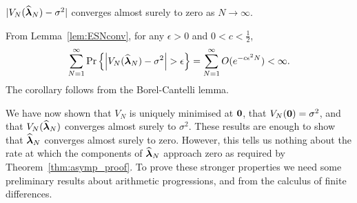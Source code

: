 \documentclass[journal]{IEEEtran}
\begin{document}
\begin{corollary}  \label{cor:ESNconvcor}
$\vert V_N(\widehat{\boldsymbol{\lambda}}_N) - \sigma^2 \vert$ converges almost surely to zero as $N\rightarrow\infty$.
\end{corollary}
\begin{IEEEproof}
From Lemma~\ref{lem:ESNconv}, for any $\epsilon > 0$ and $0 < c < \tfrac{1}{2}$,
\[
\sum_{N=1}^{\infty}\operatorname{Pr}\left\{ \left\vert V_N(\widehat{\boldsymbol{\lambda}}_N) - \sigma^2 \right\vert > \epsilon \right\} = \sum_{N=1}^{\infty} O(e^{-c \epsilon^2 N}) < \infty.
\]
The corollary follows from the Borel-Cantelli lemma.
\end{IEEEproof}


We have now shown that $V_N$ is uniquely minimised at $\boldsymbol{0}$, that $V_N(\boldsymbol{0}) = \sigma^2$, and that $V_N(\widehat{\boldsymbol{\lambda}}_N)$ converges almost surely to $\sigma^2$.  These results are enough to show that $\widehat{\boldsymbol{\lambda}}_N$ converges almost surely to zero.  However, this tells us nothing about the rate at which the components of $\widehat{\boldsymbol{\lambda}}_N$ approach zero as required by Theorem~\ref{thm:asymp_proof}.  To prove these stronger properties we need some preliminary results about arithmetic progressions, and from the calculus of finite differences.
 
\end{document}
